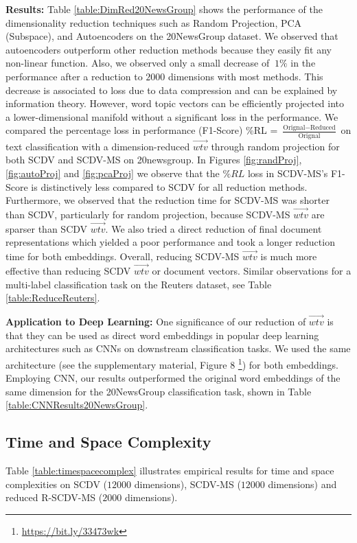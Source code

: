 \documentclass{ecai}
\begin{document}
\vspace{0.2cm}
\noindent \textbf{Results:} Table \ref{table:DimRed20NewsGroup} shows the performance of the dimensionality reduction techniques such as Random Projection, PCA (Subspace), and Autoencoders on the 20NewsGroup dataset. We observed that autoencoders outperform other reduction methods because they easily fit any non-linear function. Also, we observed only a small decrease of $~1\%$ in the performance after a reduction to $2000$ dimensions with most methods. This decrease is associated to loss due to data compression and can be explained by information theory. However, word topic vectors can be efficiently projected into a lower-dimensional manifold without a significant loss in the performance. 
We compared the percentage loss in performance (F1-Score) \%RL = $\frac{\text{Orignal} - \text{Reduced}}{\text{Orignal}}$ on text classification with a dimension-reduced $\vec{wtv}$ through random projection for both SCDV and SCDV-MS on 20newsgroup. In Figures \ref{fig:randProj}, \ref{fig:autoProj} and \ref{fig:pcaProj} we observe that the $\%RL$ loss in SCDV-MS's F1-Score is distinctively less compared to SCDV for all reduction methods. Furthermore, we observed that the reduction time for SCDV-MS was shorter than SCDV, particularly for random projection, because SCDV-MS $\vec{wtv}$ are sparser than SCDV $\vec{wtv}$. We also tried a direct reduction of final document representations which yielded a poor performance and took a longer reduction time for both embeddings. Overall, reducing SCDV-MS $\vec{wtv}$ is much more effective than reducing SCDV $\vec{wtv}$ or document vectors. Similar observations for a multi-label classification task on the Reuters dataset, see Table \ref{table:ReduceReuters}. 




\vspace{0.5em}
\noindent \textbf{Application to Deep Learning: }One significance of our reduction of $\vec{wtv}$ is that they can be used as direct word embeddings in popular deep learning architectures such as CNNs on downstream classification tasks. We used the same architecture (see the supplementary material, Figure 8 \footnote{ \url{https://bit.ly/33473wk}}) for both embeddings. Employing CNN, our results outperformed the original word embeddings of the same dimension for the 20NewsGroup classification task, shown in Table \ref{table:CNNResults20NewsGroup}.
\subsection{Time and Space Complexity}
\label{subsec:timespacecomplexity}
Table \ref{table:timespacecomplex} illustrates empirical results for time and space complexities on SCDV ($12000$ dimensions), SCDV-MS ($12000$ dimensions) and reduced R-SCDV-MS ($2000$ dimensions). 
\end{document}
